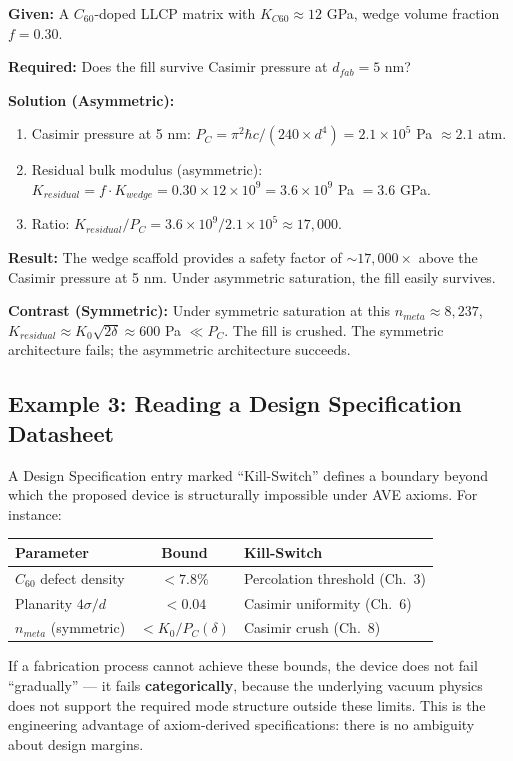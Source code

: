 \begin{examplebox}
\textbf{Given:} A $C_{60}$-doped LLCP matrix with $K_{C60} \approx 12$ GPa, wedge volume fraction $f = 0.30$.

\textbf{Required:} Does the fill survive Casimir pressure at $d_{fab} = 5$ nm?

\textbf{Solution (Asymmetric):}
\begin{enumerate}
    \item Casimir pressure at 5 nm: $P_C = \pi^2 \hbar c / (240 \times d^4) = 2.1 \times 10^5$ Pa $\approx 2.1$ atm.
    \item Residual bulk modulus (asymmetric): $K_{residual} = f \cdot K_{wedge} = 0.30 \times 12 \times 10^9 = 3.6 \times 10^9$ Pa $= 3.6$ GPa.
    \item Ratio: $K_{residual}/P_C = 3.6 \times 10^9 / 2.1 \times 10^5 \approx 17{,}000$.
\end{enumerate}
\textbf{Result:} The wedge scaffold provides a safety factor of $\sim 17{,}000\times$ above the Casimir pressure at 5 nm. Under asymmetric saturation, the fill easily survives.

\textbf{Contrast (Symmetric):} Under symmetric saturation at this $n_{meta} \approx 8{,}237$, $K_{residual} \approx K_0 \sqrt{2\delta} \approx 600$ Pa $\ll P_C$. The fill is crushed. The symmetric architecture fails; the asymmetric architecture succeeds.
\end{examplebox}

\subsection{Example 3: Reading a Design Specification Datasheet}

\begin{examplebox}
A Design Specification entry marked ``Kill-Switch'' defines a boundary beyond which the proposed device is structurally impossible under AVE axioms. For instance:

\begin{center}
\small
\begin{tabular}{l c l}
\hline\hline
\textbf{Parameter} & \textbf{Bound} & \textbf{Kill-Switch} \\
\hline
$C_{60}$ defect density & $< 7.8\%$ & Percolation threshold (Ch.~3) \\
Planarity $4\sigma/d$ & $< 0.04$ & Casimir uniformity (Ch.~6) \\
$n_{meta}$ (symmetric) & $< K_{0}/P_C(\delta)$ & Casimir crush (Ch.~8) \\
\hline\hline
\end{tabular}
\end{center}

If a fabrication process cannot achieve these bounds, the device does not fail ``gradually'' --- it fails \textbf{categorically}, because the underlying vacuum physics does not support the required mode structure outside these limits. This is the engineering advantage of axiom-derived specifications: there is no ambiguity about design margins.
\end{examplebox}

